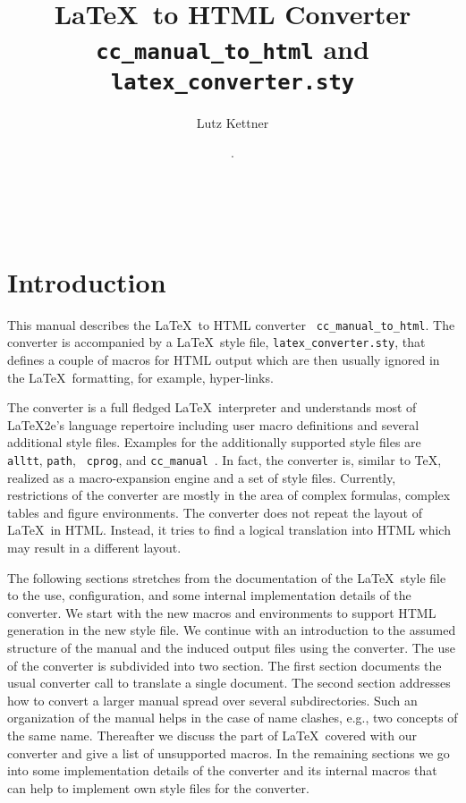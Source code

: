 \documentclass[11pt]{article}
\title{\LaTeX\ to HTML Converter\\
       {\tt cc\_manual\_to\_html} and {\tt latex\_converter.sty}}
\author{Lutz Kettner}
\date{\lcRevision. \lcDate}
\begin{document}
\maketitle

\tableofcontents
\thispagestyle{empty}
\clearpage
\thispagestyle{empty}
~\vfill



\cleardoublepage\setcounter{page}{1}

\section{Introduction}

This manual describes the \LaTeX\ to HTML converter {\tt
  cc\_manual\_to\_html}. The converter is accompanied by a \LaTeX\ style
file, {\tt latex\_converter.sty}, that defines a couple of macros for
HTML output which are then usually ignored in the \LaTeX\ formatting,
for example, hyper-links.

The converter is a full fledged \LaTeX\ interpreter and understands
most of \LaTeX2e's language repertoire including user macro
definitions and several additional style files.  Examples for the
additionally supported style files are {\tt alltt}, {\tt path}, {\tt
  cprog}, and {\tt cc\_manual}~\cite{k-clswr-99}. In fact, the
converter is, similar to \TeX, realized as a macro-expansion engine
and a set of style files.  Currently, restrictions of the converter
are mostly in the area of complex formulas, complex tables and figure
environments. The converter does not repeat the layout of \LaTeX\ in
HTML. Instead, it tries to find a logical translation into HTML which
may result in a different layout.

The following sections stretches from the documentation of the \LaTeX\ 
style file to the use, configuration, and some internal implementation
details of the converter. We start with the new macros and
environments to support HTML generation in the new style file. We
continue with an introduction to the assumed structure of the manual
and the induced output files using the converter. The use of the
converter is subdivided into two section. The first section documents
the usual converter call to translate a single document. The second
section addresses how to convert a larger manual spread over several
subdirectories. Such an organization of the manual helps in the case
of name clashes, e.g., two concepts of the same name.  Thereafter we
discuss the part of \LaTeX\ covered with our converter and give a list
of unsupported macros. In the remaining sections we go into some
implementation details of the converter and its internal macros that
can help to implement own style files for the converter.
\end{document}
